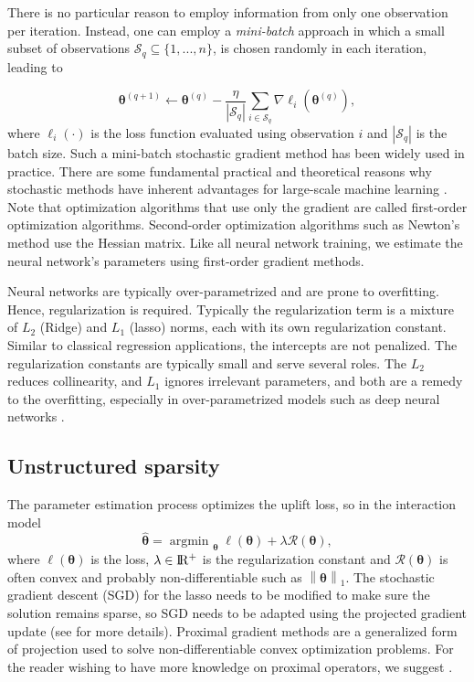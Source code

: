 \documentclass{article}
\def\R{\mathcal R}
\def \real{\rm I\!R}
\newcommand{\norm}[1]{\left\lVert#1\right\rVert}
\DeclareMathOperator*{\argmin}{argmin~} %
\begin{document}
There is no particular reason to employ information from only one observation per iteration. Instead, one can employ a {\it mini-batch} approach in which a small subset of observations $\mathcal{S}_q \subseteq \{1, ..., n\}$, is chosen randomly in each iteration, leading to

\begin{equation}
    \boldsymbol{\theta}^{(q+1)} \leftarrow \boldsymbol{\theta}^{(q)} - \frac{\eta}{|\mathcal{S}_q|} \sum_{i \in \mathcal{S}_q} \nabla \ell_{i} (\boldsymbol{\theta}^{(q)}),
    \label{eq:mini-batch-sgd}
\end{equation}
where $\ell_{i}(\cdot)$ is the loss function evaluated using observation $i$ and $|\mathcal{S}_q|$ is the batch size. Such a mini-batch stochastic gradient method has been widely used in practice.  There are some fundamental practical and theoretical reasons why stochastic methods have inherent advantages for large-scale machine learning \citep{bottou2018optimization}. Note that optimization algorithms that use only the gradient are called first-order optimization algorithms. Second-order optimization algorithms such as Newton's method use the Hessian matrix. Like all neural network training, we estimate the neural network's parameters using first-order gradient methods. 

Neural networks are typically over-parametrized and are prone to overfitting. Hence, regularization is required. Typically the regularization term is a mixture of $L_2$ (Ridge) and $L_1$ (lasso) norms, each with its own regularization constant. Similar to classical regression applications, the intercepts are not penalized. The regularization constants are typically small and serve several roles. The $L_2$ reduces collinearity, and $L_1$ ignores irrelevant parameters, and both are a remedy to the overfitting, especially in over-parametrized models such as deep neural networks \citep{efron2016computer}.

\subsection{Unstructured sparsity}

The parameter estimation process optimizes the uplift loss, so in the interaction model  
%
\begin{equation}
\boldsymbol{\hat{\theta}} = \argmin_{\boldsymbol{\theta}} \ell(\boldsymbol{\theta}) +\lambda \R(\boldsymbol{\theta}),
\label{eq:optim_uplift_interact}
\end{equation}
where $\ell(\boldsymbol{\theta})$ is the loss, $\lambda \in \real^+$ is the regularization constant and $\R(\boldsymbol{\theta})$ is often convex and probably non-differentiable such as $\norm{\boldsymbol{\theta}}_1$.
The stochastic gradient descent (SGD) for the lasso needs to be modified to make sure the solution remains sparse, so SGD needs to be adapted using the projected gradient update (see \cite{mosci2010solving} for more details). Proximal gradient methods are a generalized form of projection used to solve non-differentiable convex optimization problems. For the reader wishing to have more knowledge on proximal operators, we suggest \cite[Chapter 6]{beck2017first}.
\end{document}

